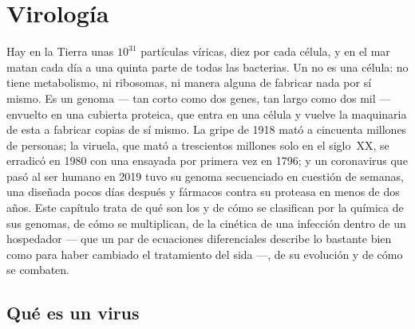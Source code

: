 \chapter{Virología}\label{ch:b3:virology}

Hay en la Tierra unas $10^{31}$ partículas víricas, diez por cada célula,
y en el mar matan cada día a una quinta parte de todas las bacterias. Un
 no es una célula: no tiene metabolismo, ni ribosomas, ni manera
alguna de fabricar nada por sí mismo. Es un genoma --- tan corto como dos
genes, tan largo como dos mil --- envuelto en una cubierta proteica, que
entra en una célula y vuelve la maquinaria de esta a fabricar copias de
sí mismo. La gripe de 1918 mató a cincuenta millones de personas; la
viruela, que mató a trescientos millones solo en el siglo~XX, se erradicó
en 1980 con una  ensayada por primera vez en 1796; y un coronavirus
que pasó al ser humano en 2019 tuvo su genoma secuenciado en cuestión de
semanas, una  diseñada pocos días después y fármacos contra su
proteasa en menos de dos años. Este capítulo trata de qué son los  y
de cómo se clasifican por la química de sus genomas, de cómo se
multiplican, de la cinética de una infección dentro de un hospedador ---
que un par de ecuaciones diferenciales describe lo bastante bien como
para haber cambiado el tratamiento del sida ---, de su evolución y de
cómo se combaten.

\section{Qué es un virus}

